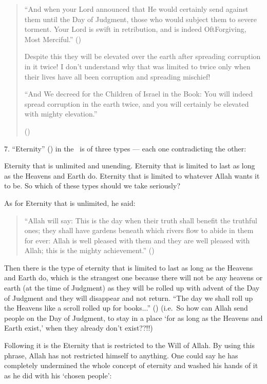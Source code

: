 \documentclass[12pt]{memoir}
\begin{document}
\begin{quote}
“And when your Lord announced that He would certainly send against them
until the Day of Judgment, those who would subject them to severe torment.
Your Lord is swift in retribution,
and is indeed Oft\–Forgiving, Most Merciful.” ()

Despite this they will be elevated over the earth
after spreading corruption in it twice!
I don’t understand why that was limited to twice
only when their lives have all been corruption and spreading mischief!

“And We decreed for the Children of Israel in the Book:
You will indeed spread corruption in the earth twice,
and you will certainly be elevated with mighty elevation.”

()
\end{quote}

7. “Eternity” () in the \Quran\ is of three types —
each one contradicting the other:

Eternity that is unlimited and unending.
Eternity that is limited to last as long as the Heavens and Earth do.
Eternity that is limited to whatever Allah wants it to be.
So which of these types should we take seriously?

As for Eternity that is unlimited, he said:

\begin{quote}
“Allah will say:
This is the day when their truth shall benefit the truthful ones;
they shall have gardens beneath which rivers flow to abide in them for ever:
Allah is well pleased with them and they are well pleased with Allah;
this is the mighty achievement.” ()
\end{quote}

Then there is the type of eternity that is limited to last
as long as the Heavens and Earth do,
which is the strangest one because there will not be any heavens or earth
(at the time of Judgment) as they will be rolled up
with advent of the Day of Judgment and they will disappear and not return.
“The day we shall roll up the Heavens like a scroll rolled up for books...”
()
(i.e.\ So how can Allah send people on the Day of Judgment,
to stay in a place ‘for as long as the Heavens and Earth exist,’
when they already don’t exist??!!)

Following it is the Eternity that is restricted to the Will of Allah.
By using this phrase, Allah has not restricted himself to anything.
One could say he has completely undermined the whole concept of eternity
and washed his hands of it as he did with his ‘chosen people’:
\end{document}
